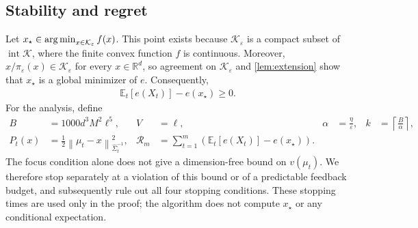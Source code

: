 \documentclass[11pt]{article}
\newcommand{\R}{\mathbb R}
\newcommand{\E}{\mathbb E}
\newcommand{\K}{\mathcal K}
\newcommand{\argmin}{\operatornamewithlimits{arg\,min}}
\newcommand{\1}{\mathbf 1}
\newcommand{\eps}{\varepsilon}
\newcommand{\normm}[2]{\left\lVert #1\right\rVert_{#2}}
\begin{document}
\subsection{Stability and regret}
\label{sec:stability}

Let $x_\star\in\argmin_{x\in\K_\eps}f(x)$.
This point exists because $\K_\eps$ is a compact subset of
$\operatorname{int}\K$, where the finite convex function $f$ is continuous.
Moreover, $x/\pi_\eps(x)\in\K_\eps$ for every $x\in\R^d$, so agreement on
$\K_\eps$ and \cref{lem:extension} show that $x_\star$ is a global
minimizer of $e$. Consequently,
\begin{align}
    \E_t[e(X_t)]-e(x_\star)\geq0.
    \label{eq:stationarity-sign}
\end{align}
For the analysis, define
\begin{align}
    B      & =1000d^3M^2\ell^5,
           & V                                                 & =\ell,
           & \alpha                                            & =\frac{\eta}{\eps},
           & k                                                 & =\left\lceil\frac B\alpha\right\rceil,
    \label{eq:analysis-budgets}
    \\
    P_t(x) & =\frac12\normm{\mu_t-x}{\widehat\Sigma_t^{-1}}^2,
           & \mathcal R_m                                      & =\sum_{t=1}^m
    \left(\E_t[e(X_t)]-e(x_\star)\right).
    \label{eq:analysis-potentials}
\end{align}
The focus condition alone does not give a dimension-free bound on
$v(\mu_t)$. We therefore stop separately at a violation of this bound or
of a predictable feedback budget, and subsequently rule out all four
stopping conditions. These stopping times are used only in the proof;
the algorithm does not compute $x_\star$ or any conditional expectation.
\end{document}
